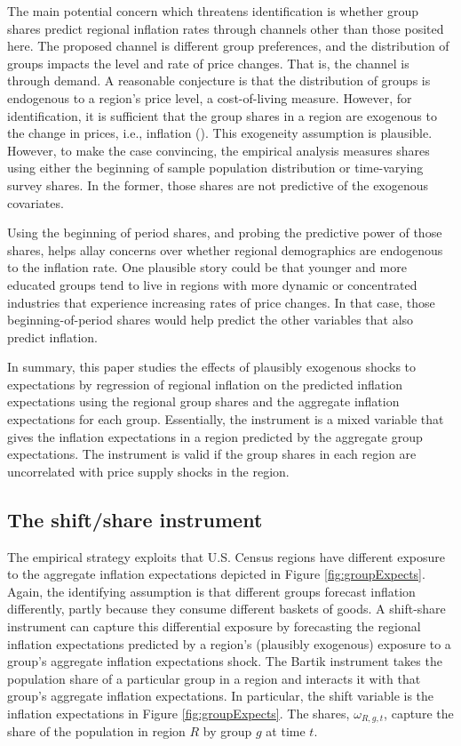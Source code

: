 \documentclass[12pt]{article}
\begin{document}
The main potential concern which threatens identification is whether group shares predict regional inflation rates through channels other than those posited here. The proposed channel is different group preferences, and the distribution of groups impacts the level and rate of price changes. That is, the channel is through demand. A reasonable conjecture is that the distribution of groups is endogenous to a region's price level, a cost-of-living measure. However, for identification, it is sufficient that the group shares in a region are exogenous to the change in prices, i.e., inflation (\cite{Pinkhametal:AER2020}). This exogeneity assumption is plausible. However, to make the case convincing, the empirical analysis measures shares using either the beginning of sample population distribution or time-varying survey shares. In the former, those shares are not predictive of the exogenous covariates.

Using the beginning of period shares, and probing the predictive power of those shares, helps allay concerns over whether regional demographics are endogenous to the inflation rate. One plausible story could be that younger and more educated groups tend to live in regions with more dynamic or concentrated industries that experience increasing rates of price changes. In that case, those beginning-of-period shares would help predict the other variables that also predict inflation.  

In summary, this paper studies the effects of plausibly exogenous shocks to expectations by regression of regional inflation on the predicted inflation expectations using the regional group shares and the aggregate inflation expectations for each group. Essentially, the instrument is a mixed variable that gives the inflation expectations in a region predicted by the aggregate group expectations. The instrument is valid if the group shares in each region are uncorrelated with price supply shocks in the region.

 \subsection{The shift/share instrument}


The empirical strategy exploits that U.S. Census regions have different exposure to the aggregate inflation expectations depicted in Figure \ref{fig:groupExpects}. Again, the identifying assumption is that different groups forecast inflation differently, partly because they consume different baskets of goods. A shift-share instrument can capture this differential exposure by forecasting the regional inflation expectations predicted by a region's (plausibly exogenous) exposure to a group's aggregate inflation expectations shock. The Bartik instrument takes the population share of a particular group in a region and interacts it with that group's aggregate inflation expectations. In particular, the shift variable is the inflation expectations in Figure \ref{fig:groupExpects}. The shares, $\omega_{R,g,t}$, capture the share of the population in region $R$ by group $g$ at time $t$.  
\end{document}
